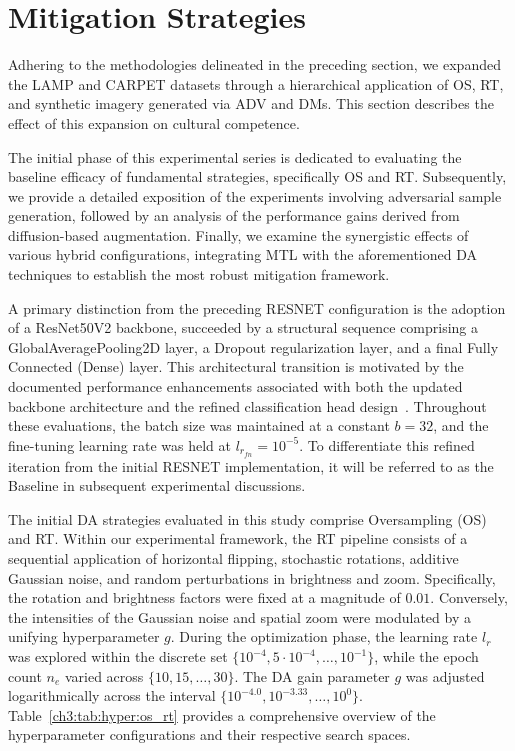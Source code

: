 \section{Mitigation Strategies}
%
Adhering to the methodologies delineated in the preceding section, we expanded the LAMP and CARPET datasets through a hierarchical application of OS, RT, and synthetic imagery generated via ADV and DMs.
This section describes the effect of this expansion on cultural competence.

The initial phase of this experimental series is dedicated to evaluating the baseline efficacy of fundamental strategies, specifically OS and RT. 
Subsequently, we provide a detailed exposition of the experiments involving adversarial sample generation, followed by an analysis of the performance gains derived from diffusion-based augmentation. Finally, we examine the synergistic effects of various hybrid configurations, integrating MTL with the aforementioned DA techniques to establish the most robust mitigation framework.

A primary distinction from the preceding RESNET configuration is the adoption of a ResNet50V2 backbone, succeeded by a structural sequence comprising a GlobalAveragePooling2D layer, a Dropout regularization layer, and a final Fully Connected (Dense) layer. 
This architectural transition is motivated by the documented performance enhancements associated with both the updated backbone architecture and the refined classification head design~\citep{szegedy2015going}.
Throughout these evaluations, the batch size was maintained at a constant $b=32$, and the fine-tuning learning rate was held at $l_{r_{fn}}=10^{-5}$. To differentiate this refined iteration from the initial RESNET implementation, it will be referred to as the Baseline in subsequent experimental discussions.

The initial DA strategies evaluated in this study comprise Oversampling (OS) and RT. Within our experimental framework, the RT pipeline consists of a sequential application of horizontal flipping, stochastic rotations, additive Gaussian noise, and random perturbations in brightness and zoom.
Specifically, the rotation and brightness factors were fixed at a magnitude of $0.01$. 
Conversely, the intensities of the Gaussian noise and spatial zoom were modulated by a unifying hyperparameter $g$. 
During the optimization phase, the learning rate $l_r$ was explored within the discrete set $\{10^{-4}, 5 \cdot 10^{-4}, \dots, 10^{-1}\}$, while the epoch count $n_e$ varied across $\{10, 15, \dots, 30\}$. The DA gain parameter $g$ was adjusted logarithmically across the interval $\{10^{-4.0}, 10^{-3.33}, \dots, 10^{0}\}$.
Table~\ref{ch3:tab:hyper:os_rt} provides a comprehensive overview of the hyperparameter configurations and their respective search spaces.

